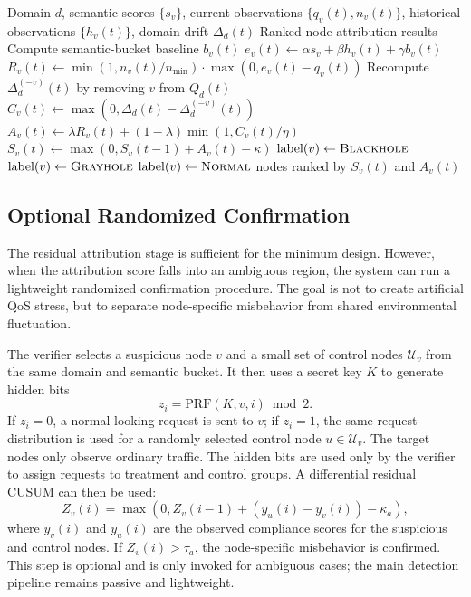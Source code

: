 \begin{algorithm}[t]
\caption{Node-Level Residual Attribution}
\label{alg:node-attribution}
\begin{algorithmic}[1]
\Require Domain $d$, semantic scores $\{s_v\}$, current observations
$\{q_v(t), n_v(t)\}$, historical observations $\{h_v(t)\}$,
domain drift $\Delta_d(t)$
\Ensure Ranked node attribution results
    \State Compute semantic-bucket baseline $b_v(t)$
    \State $e_v(t) \gets \alpha s_v + \beta h_v(t) + \gamma b_v(t)$
    \State $R_v(t) \gets \min(1,n_v(t)/n_{\min})\cdot
    \max(0,e_v(t)-q_v(t))$
    \State Recompute $\Delta_d^{(-v)}(t)$ by removing $v$ from $Q_d(t)$
    \State $C_v(t) \gets \max(0,\Delta_d(t)-\Delta_d^{(-v)}(t))$
    \State $A_v(t) \gets \lambda R_v(t) +
    (1-\lambda)\min(1,C_v(t)/\eta)$
    \State $S_v(t) \gets \max(0,S_v(t-1)+A_v(t)-\kappa)$
            \State $\mathrm{label}(v) \gets \textsc{Blackhole}$
        \Else
            \State $\mathrm{label}(v) \gets \textsc{Grayhole}$
        \EndIf
    \Else
        \State $\mathrm{label}(v) \gets \textsc{Normal}$
    \EndIf
\EndFor
\State \Return nodes ranked by $S_v(t)$ and $A_v(t)$
\end{algorithmic}
\end{algorithm}

\subsection{Optional Randomized Confirmation}
\label{sec:randomized-confirmation}

The residual attribution stage is sufficient for the minimum design.
However, when the attribution score falls into an ambiguous region, the
system can run a lightweight randomized confirmation procedure. The goal
is not to create artificial QoS stress, but to separate node-specific
misbehavior from shared environmental fluctuation.

The verifier selects a suspicious node $v$ and a small set of control
nodes $\mathcal{U}_v$ from the same domain and semantic bucket. It then
uses a secret key $K$ to generate hidden bits
\begin{equation}
    z_i = \mathrm{PRF}(K, v, i) \bmod 2.
\end{equation}
If $z_i=0$, a normal-looking request is sent to $v$; if $z_i=1$, the same
request distribution is used for a randomly selected control node
$u \in \mathcal{U}_v$. The target nodes only observe ordinary traffic.
The hidden bits are used only by the verifier to assign requests to
treatment and control groups. A differential residual CUSUM can then be
used:
\begin{equation}
    Z_v(i) =
    \max\left(0, Z_v(i-1) +
    \left(y_u(i)-y_v(i)\right) - \kappa_a\right),
\end{equation}
where $y_v(i)$ and $y_u(i)$ are the observed compliance scores for the
suspicious and control nodes. If $Z_v(i)>\tau_a$, the node-specific
misbehavior is confirmed. This step is optional and is only invoked for
ambiguous cases; the main detection pipeline remains passive and
lightweight.

